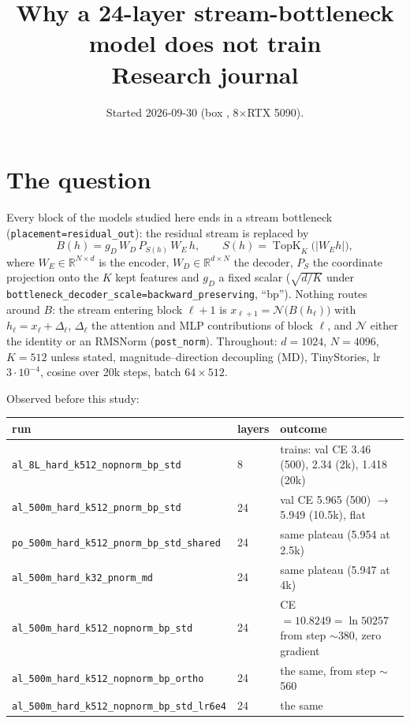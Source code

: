 \documentclass[11pt,a4paper]{article}
\title{
Why a 24-layer stream-bottleneck model does not train\\[2pt]
\large Research journal
}
\author{}
\date{Started 2026-09-30 (box \code{lisbon}, 8$\times$RTX 5090).}
\newcommand{\code}[1]{\texttt{#1}}
\newcommand{\topk}{\operatorname{TopK}}
\begin{document}
\maketitle
\vspace{-2em}
\tableofcontents

\section{The question}

Every block of the models studied here ends in a stream bottleneck
(\code{placement=residual\_out}): the residual stream is replaced by
\begin{equation}
  B(h) = g_D\, W_D\, P_{S(h)}\, W_E\, h ,
  \qquad S(h) = \topk_K\bigl(|W_E h|\bigr),
  \label{eq:B}
\end{equation}
where \(W_E\in\mathbb{R}^{N\times d}\) is the encoder, \(W_D\in\mathbb{R}^{d\times N}\)
the decoder, \(P_S\) the coordinate projection onto the \(K\) kept features and
\(g_D\) a fixed scalar (\(\sqrt{d/K}\) under
\code{bottleneck\_decoder\_scale=backward\_preserving}, ``bp'').  Nothing routes
around \(B\): the stream entering block \(\ell+1\) is
\(x_{\ell+1}=\mathcal N\bigl(B(h_\ell)\bigr)\) with \(h_\ell = x_\ell+\Delta_\ell\),
\(\Delta_\ell\) the attention and MLP contributions of block \(\ell\), and
\(\mathcal N\) either the identity or an RMSNorm (\code{post\_norm}).
Throughout: \(d=1024\), \(N=4096\), \(K=512\) unless stated,
magnitude--direction decoupling (MD), TinyStories, lr \(3\cdot10^{-4}\),
cosine over 20k steps, batch \(64\times512\).

Observed before this study:

\begin{center}\small
\begin{tabular}{p{5.6cm}lp{6.4cm}}
\toprule
run & layers & outcome \\
\midrule
\code{al\_8L\_hard\_k512\_nopnorm\_bp\_std} & 8 & trains: val CE 3.46 (500), 2.34 (2k), 1.418 (20k) \\
\code{al\_500m\_hard\_k512\_pnorm\_bp\_std} & 24 & val CE 5.965 (500) \(\to\) 5.949 (10.5k), flat \\
\code{po\_500m\_hard\_k512\_pnorm\_bp\_std\_shared} & 24 & same plateau (5.954 at 2.5k) \\
\code{al\_500m\_hard\_k32\_pnorm\_md} & 24 & same plateau (5.947 at 4k) \\
\code{al\_500m\_hard\_k512\_nopnorm\_bp\_std} & 24 & CE \(=10.8249=\ln 50257\) from step \(\sim\)380, zero gradient \\
\code{al\_500m\_hard\_k512\_nopnorm\_bp\_ortho} & 24 & the same, from step \(\sim\)560 \\
\code{al\_500m\_hard\_k512\_nopnorm\_bp\_std\_lr6e4} & 24 & the same \\
\bottomrule
\end{tabular}
\end{center}
\end{document}

